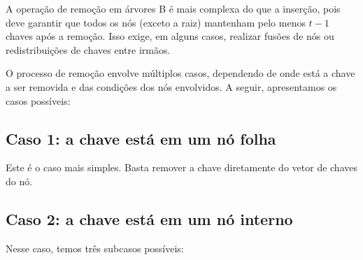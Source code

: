 A operação de remoção em árvores B é mais complexa do que a inserção, pois deve garantir que todos os nós (exceto a raiz) mantenham pelo menos \( t - 1 \) chaves após a remoção. 
Isso exige, em alguns casos, realizar fusões de nós ou redistribuições de chaves entre irmãos.

O processo de remoção envolve múltiplos casos, dependendo de onde está a chave a ser removida e das condições dos nós envolvidos. 
A seguir, apresentamos os casos possíveis:

\subsection*{Caso 1: a chave está em um nó folha}

Este é o caso mais simples. 
Basta remover a chave diretamente do vetor de chaves do nó.

\subsection*{Caso 2: a chave está em um nó interno}

Nesse caso, temos três subcasos possíveis:

